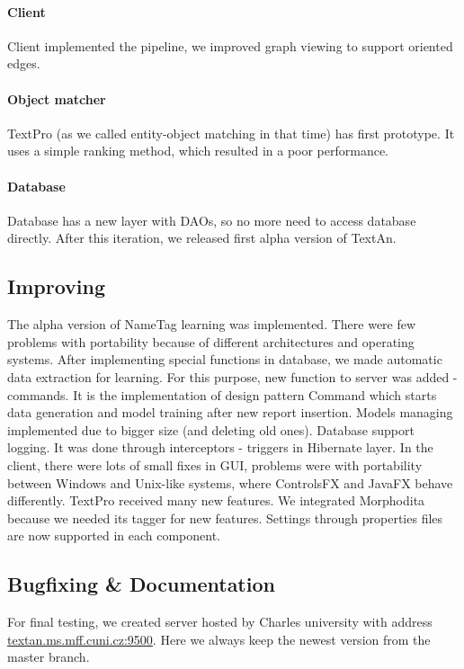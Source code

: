 \paragraph{Client} Client implemented the pipeline, we improved graph viewing to
support oriented edges.

\paragraph{Object matcher} TextPro (as we called entity-object matching in that
time) has first prototype. It uses a simple ranking method, which resulted in a
poor performance. 

\paragraph{Database} Database has a new layer with DAOs, so no more need to
access database directly. After this iteration, we released first alpha version
of TextAn.

\subsection{Improving}
The alpha version of NameTag learning was implemented. There were few problems
with portability because of different architectures and operating systems. After
implementing special functions in database, we made automatic data extraction
for learning. For this purpose, new function to server was added - commands. It
is the implementation of design pattern Command which starts data generation and
model training after new report insertion. Models managing implemented due to
bigger size (and deleting old ones). Database support logging. It was done
through interceptors - triggers in Hibernate layer. In the client, there were
lots of small fixes in GUI, problems were with portability between Windows and
Unix-like systems, where ControlsFX and JavaFX behave differently. TextPro
received many new features. We integrated Morphodita because we needed its
tagger for new features. Settings through properties files are now supported in
each component.

\subsection{Bugfixing \& Documentation}
For final testing, we created server hosted by Charles university with address
\url{textan.ms.mff.cuni.cz:9500}. Here we always keep the newest version from
the master branch.

